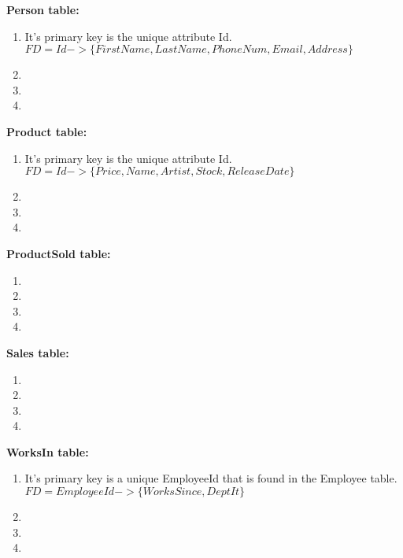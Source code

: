 \documentclass{article}
\begin{document}
  \par\textbf{Person table:}
  \begin{enumerate}[label=\roman*]
  	\item It's primary key is the unique attribute Id. \newline
    $FD = Id -> \{FirstName, LastName, PhoneNum, Email, Address\}$
  	\item
  	\item
  	\item
  \end{enumerate}
  \par\textbf{Product table:}
  \begin{enumerate}[label=\roman*]
  	\item It's primary key is the unique attribute Id. \newline
    $FD = Id -> \{Price, Name, Artist, Stock, ReleaseDate\}$
  	\item
  	\item
  	\item
  \end{enumerate}
  \par\textbf{ProductSold table:}
  \begin{enumerate}[label=\roman*]
  	\item
  	\item
  	\item
  	\item
  \end{enumerate}
  \par\textbf{Sales table:}
  \begin{enumerate}[label=\roman*]
  	\item
  	\item
  	\item
  	\item
  \end{enumerate}
  \par\textbf{WorksIn table:}
  \begin{enumerate}[label=\roman*]
  	\item It's primary key is a unique EmployeeId that is found in the Employee table. \newline
    $FD = EmployeeId -> \{WorksSince, DeptIt\}$
  	\item
  	\item
  	\item
  \end{enumerate}
\end{document}
